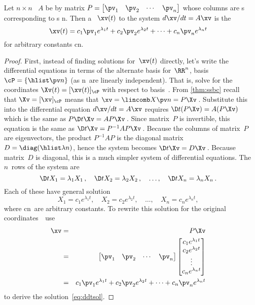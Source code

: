 \begin{theorem} \label{thm:ddtsol}
Let \(n\times n\) ~\(A\) be  by matrix \(P=\begin{bmatrix} \pv_1&\pv_2&\cdots&\pv_n \end{bmatrix}\) whose columns are s corresponding to s \hlist\lambda n.  
Then a ~\(\xv(t)\) to the  system \(d\xv/dt=A\xv\) is the 
\begin{equation}
\xv(t)=c_1\pv_1e^{\lambda_1t}+c_2\pv_2e^{\lambda_2t}+\cdots+c_n\pv_ne^{\lambda_nt}
\label{eq:ddtsol}
\end{equation}
for arbitrary constants \hlist cn.
\end{theorem}

\begin{proof} 
First, instead of finding solutions for~\(\xv(t)\) directly, let's write the differential equations in terms of the alternate basis for~\(\RR^n\), basis \(\cP=\{\hlist\pv n\}\) (as \hlist\pv n\ are linearly independent).
That is, solve for the coordinates \(\Xv(t)=[\xv(t)]_\cP\) with respect to basis~\cP.
From \autoref{thm:ssbc} recall that  \(\Xv=[\xv]_\cP\) means that \(\xv=\lincomb X\pv n=P\Xv\)\,.
Substitute this into the differential equation \(d\xv/dt=A\xv\) requires \(\D t{}(P\Xv)=A(P\Xv)\) which is the same as \(P\D t\Xv=AP\Xv\)\,.
Since matrix~\(P\) is invertible, this equation is the same as \(\D t\Xv=P^{-1}AP\Xv\)\,.
Because the columns of matrix~\(P\) are eigenvectors, the product \(P^{-1}AP\) is the diagonal matrix \(D=\diag(\hlist\lambda n)\), hence the system becomes \(\D t\Xv=D\Xv\)\,.
Because matrix~\(D\) is diagonal, this is a much simpler system of differential equations.
The \(n\)~rows of the system are
\begin{equation*}
\D t{X_1}=\lambda_1X_1\,,\quad
\D t{X_2}=\lambda_2X_2\,,\quad \ldots,\quad
\D t{X_n}=\lambda_nX_n\,.
\end{equation*}
Each of these have general solution
\begin{equation*}
X_1=c_1e^{\lambda_1t},\quad
X_2=c_2e^{\lambda_2t},\quad \ldots,\quad
X_n=c_ne^{\lambda_nt},
\end{equation*}
where \hlist cn\ are arbitrary constants.
To rewrite this solution for the original coordinates~\xv\ use
\begin{eqnarray*}
\xv&=&P\Xv
\\&=&\begin{bmatrix} \pv_1&\pv_2&\cdots&\pv_n \end{bmatrix}
\begin{bmatrix} c_1e^{\lambda_1t}
\\c_2e^{\lambda_2t}
\\\vdots
\\c_ne^{\lambda_nt} \end{bmatrix}
\\&=&c_1\pv_1e^{\lambda_1t}+c_2\pv_2e^{\lambda_2t}+\cdots+c_n\pv_ne^{\lambda_nt}
\end{eqnarray*}
to derive the solution~\eqref{eq:ddtsol}.


\end{proof}
